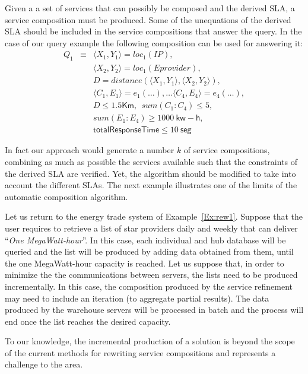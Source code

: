Given a a set of services that can possibly be composed and the derived SLA, a service composition must be produced.
Some of the unequations of the derived SLA should be included in the service compositions that answer the query.
In the case of our query example the following composition can be used for answering it:
\begin{eqnarray*}
Q_1 &\equiv&
   \langle X_1,Y_1\rangle = loc_1(IP), \\
&& \langle X_2,Y_2 \rangle = loc_1(Eprovider), \\
&& D = distance(\langle X_1,Y_1\rangle, \langle X_2,Y_2\rangle), \\
&& \langle C_1, E_1 \rangle = e_1(\dots), \dots \langle C_4, E_4 \rangle = e_4(\dots), \\
&& D \leq 1.5 \mathsf{Km},\ \ sum(C_1:C_4) \leq 5, \\
&& sum(E_1:E_4) \geq 1000\ \mathsf{kw-h}, \\
&& \mathsf{totalResponseTime}  \leq 10\ \mathsf{seg}
\end{eqnarray*}

  In fact our approach would generate a number $k$ of service compositions, combining as much as possible the services available such that the constraints of the derived SLA are verified. 
 Yet, the algorithm should be modified to take into account the different SLAs. The next example illustrates one of the limits of the automatic composition algorithm.

\begin{example}\label{Ex:rew2}
Let us return to the energy trade system of Example~\ref{Ex:rew1}.
 Suppose that the user requires to retrieve a list of star providers  daily and weekly that can deliver ``\textit{One MegaWatt-hour}''.
In this case, each individual and hub database will be queried and the list will be produced by adding data obtained from them, until the one MegaWatt-hour capacity is reached.
Let us suppose that, in order to minimize the the communications between servers, the lists need to be produced incrementally.
In this case, the composition produced by the service refinement may need to include an iteration (to aggregate partial results). 
The data produced by the warehouse servers will be processed in batch and the process will end once the list reaches the desired capacity.

To our knowledge, the incremental production of a solution is beyond  the scope of the current methods for rewriting service compositions and represents a challenge to the area.
~\hfill\openbox
\end{example}

